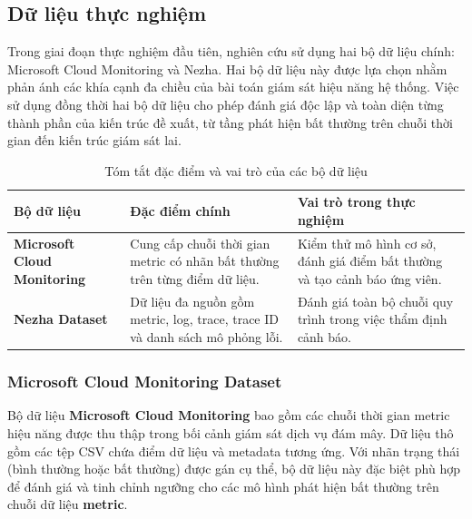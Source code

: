 \subsection{Dữ liệu thực nghiệm}
Trong giai đoạn thực nghiệm đầu tiên, nghiên cứu sử dụng hai bộ dữ liệu chính: Microsoft Cloud Monitoring và Nezha. Hai bộ dữ liệu này được lựa chọn nhằm phản ánh các khía cạnh đa chiều của bài toán giám sát hiệu năng hệ thống. Việc sử dụng đồng thời hai bộ dữ liệu cho phép đánh giá độc lập và toàn diện từng thành phần của kiến trúc đề xuất, từ tầng phát hiện bất thường trên chuỗi thời gian đến kiến trúc giám sát lai.
\begin{table}[H]
    \centering
    \renewcommand{\arraystretch}{1.6} %
    \begin{tabularx}{\textwidth}{
        >{\raggedright\arraybackslash}p{3.5cm} %
        >{\raggedright\arraybackslash}X      %
        >{\raggedright\arraybackslash}X      %
    }
        \toprule
        \rowcolor{blue!5} %
        \textbf{Bộ dữ liệu} & \textbf{Đặc điểm chính} & \textbf{Vai trò trong thực nghiệm} \\
        \midrule
        
        \textbf{Microsoft Cloud Monitoring} & 
        Cung cấp chuỗi thời gian metric có nhãn bất thường  trên từng điểm dữ liệu. & 
        Kiểm thử mô hình cơ sở, đánh giá điểm bất thường và tạo cảnh báo ứng viên. \\
        
        \textbf{Nezha Dataset} & 
        Dữ liệu đa nguồn gồm metric, log, trace, trace ID và danh sách mô phỏng lỗi. & 
        Đánh giá toàn bộ chuỗi quy trình trong việc thẩm định cảnh báo. \\
        
        \bottomrule
    \end{tabularx}
    \caption{Tóm tắt đặc điểm và vai trò của các bộ dữ liệu}
    \label{tab:dataset_summary}
\end{table}
\subsubsection{Microsoft Cloud Monitoring Dataset}
Bộ dữ liệu \textbf{Microsoft Cloud Monitoring} bao gồm các chuỗi thời gian metric hiệu năng được thu thập trong bối cảnh giám sát dịch vụ đám mây. Dữ liệu thô gồm các tệp CSV chứa điểm dữ liệu và metadata tương ứng. Với nhãn trạng thái (bình thường hoặc bất thường) được gán cụ thể, bộ dữ liệu này đặc biệt phù hợp để đánh giá và tinh chỉnh ngưỡng cho các mô hình phát hiện bất thường trên chuỗi dữ liệu \textbf{metric}.  

